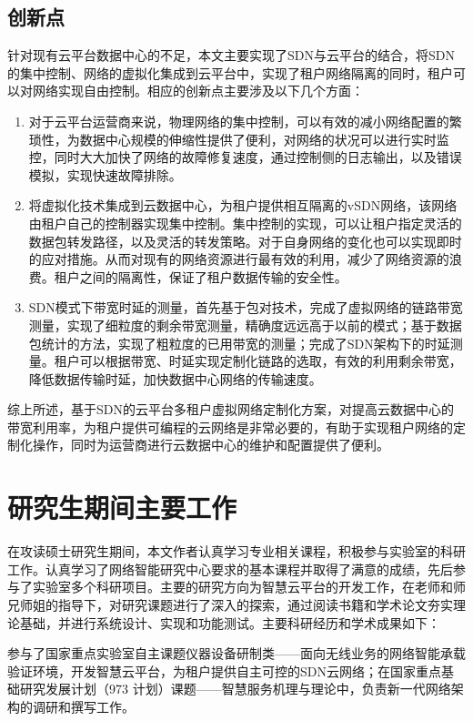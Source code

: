 \subsection{创新点}
针对现有云平台数据中心的不足，本文主要实现了SDN与云平台的结合，将SDN的集中控制、网络的虚拟化集成到云平台中，实现了租户网络隔离的同时，租户可以对网络实现自由控制。相应的创新点主要涉及以下几个方面：

\begin{enumerate}
\item 对于云平台运营商来说，物理网络的集中控制，可以有效的减小网络配置的繁琐性，为数据中心规模的伸缩性提供了便利，对网络的状况可以进行实时监控，同时大大加快了网络的故障修复速度，通过控制侧的日志输出，以及错误模拟，实现快速故障排除。
\item 将虚拟化技术集成到云数据中心，为租户提供相互隔离的vSDN网络，该网络由租户自己的控制器实现集中控制。集中控制的实现，可以让租户指定灵活的数据包转发路径，以及灵活的转发策略。对于自身网络的变化也可以实现即时的应对措施。从而对现有的网络资源进行最有效的利用，减少了网络资源的浪费。租户之间的隔离性，保证了租户数据传输的安全性。
\item SDN模式下带宽时延的测量，首先基于包对技术，完成了虚拟网络的链路带宽测量，实现了细粒度的剩余带宽测量，精确度远远高于以前的模式；基于数据包统计的方法，实现了粗粒度的已用带宽的测量；完成了SDN架构下的时延测量。租户可以根据带宽、时延实现定制化链路的选取，有效的利用剩余带宽，降低数据传输时延，加快数据中心网络的传输速度。
\end{enumerate}

综上所述，基于SDN的云平台多租户虚拟网络定制化方案，对提高云数据中心的带宽利用率，为租户提供可编程的云网络是非常必要的，有助于实现租户网络的定制化操作，同时为运营商进行云数据中心的维护和配置提供了便利。

\section{研究生期间主要工作}
在攻读硕士研究生期间，本文作者认真学习专业相关课程，积极参与实验室的科研工作。认真学习了网络智能研究中心要求的基本课程并取得了满意的成绩，先后参与了实验室多个科研项目。主要的研究方向为智慧云平台的开发工作，在老师和师兄师姐的指导下，对研究课题进行了深入的探索，通过阅读书籍和学术论文夯实理论基础，并进行系统设计、实现和功能测试。主要科研经历和学术成果如下：

参与了国家重点实验室自主课题仪器设备研制类——面向无线业务的网络智能承载验证环境，开发智慧云平台，为租户提供自主可控的SDN云网络；在国家重点基础研究发展计划（973 计划）课题——智慧服务机理与理论中，负责新一代网络架构的调研和撰写工作。

